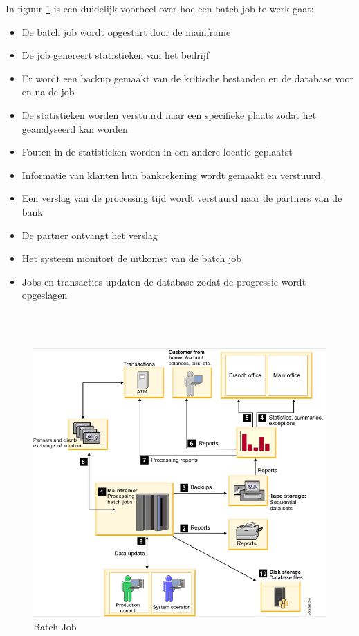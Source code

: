 In figuur \ref{fig:batch} is een duidelijk voorbeel over hoe een batch job te werk gaat:

\begin{itemize}
    \item[1] De batch job wordt opgestart door de mainframe
    \item[2] De job genereert statistieken van het bedrijf
    \item[3] Er wordt een backup gemaakt van de kritische bestanden en de database voor en na de job
    \item[4] De statistieken worden verstuurd naar een specifieke plaats zodat het geanalyseerd kan worden
    \item[5] Fouten in de statistieken worden in een andere locatie geplaatst
    \item[6] Informatie van klanten hun bankrekening wordt gemaakt en verstuurd.
    \item[7] Een verslag van de processing tijd wordt verstuurd naar de partners van de bank
    \item[8] De partner ontvangt het verslag
    \item[9] Het systeem monitort de uitkomst van de batch job
    \item[10] Jobs en transacties updaten de database zodat de progressie wordt opgeslagen
\end{itemize}
\\ \\
\begin{figure}[p!]
    \centering
    \includegraphics[width=400pt]{./graphics/BatchJobVB.png}
    \caption{Batch Job \autocite{IBMb}}
    \label{fig:batch}
\end{figure}

